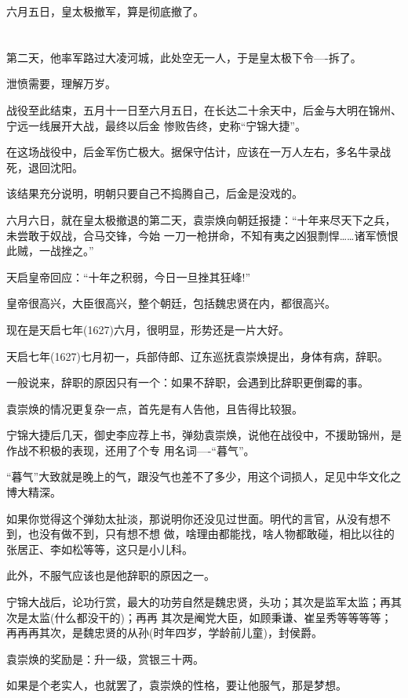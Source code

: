 \documentclass[11pt,a4paper,onecolumn]{article}
\begin{document}
六月五日，皇太极撤军，算是彻底撤了。

\section[\thesection]{}

第二天，他率军路过大凌河城，此处空无一人，于是皇太极下令----拆了。

泄愤需要，理解万岁。

战役至此结束，五月十一日至六月五日，在长达二十余天中，后金与大明在锦州、宁远一线展开大战，最终以后金
惨败告终，史称``宁锦大捷''。

在这场战役中，后金军伤亡极大。据保守估计，应该在一万人左右，多名牛录战死，退回沈阳。

该结果充分说明，明朝只要自己不捣腾自己，后金是没戏的。

六月六日，就在皇太极撤退的第二天，袁崇焕向朝廷报捷：``十年来尽天下之兵，未尝敢于奴战，合马交锋，今始
一刀一枪拼命，不知有夷之凶狠剽悍……诸军愤恨此贼，一战挫之。''

天启皇帝回应：``十年之积弱，今日一旦挫其狂峰!''

皇帝很高兴，大臣很高兴，整个朝廷，包括魏忠贤在内，都很高兴。

现在是天启七年(1627)六月，很明显，形势还是一片大好。

天启七年(1627)七月初一，兵部侍郎、辽东巡抚袁崇焕提出，身体有病，辞职。

一般说来，辞职的原因只有一个：如果不辞职，会遇到比辞职更倒霉的事。

袁崇焕的情况更复杂一点，首先是有人告他，且告得比较狠。

宁锦大捷后几天，御史李应荐上书，弹劾袁崇焕，说他在战役中，不援助锦州，是作战不积极的表现，还用了个专
用名词----``暮气''。

``暮气''大致就是晚上的气，跟没气也差不了多少，用这个词损人，足见中华文化之博大精深。

如果你觉得这个弹劾太扯淡，那说明你还没见过世面。明代的言官，从没有想不到，也没有做不到，只有想不想
做，啥理由都能找，啥人物都敢碰，相比以往的张居正、李如松等等，这只是小儿科。

此外，不服气应该也是他辞职的原因之一。

宁锦大战后，论功行赏，最大的功劳自然是魏忠贤，头功；其次是监军太监；再其次是太监(什么都没干的)；再再
其次是阉党大臣，如顾秉谦、崔呈秀等等等等；再再再其次，是魏忠贤的从孙(时年四岁，学龄前儿童)，封侯爵。

袁崇焕的奖励是：升一级，赏银三十两。

如果是个老实人，也就罢了，袁崇焕的性格，要让他服气，那是梦想。
\end{document}
